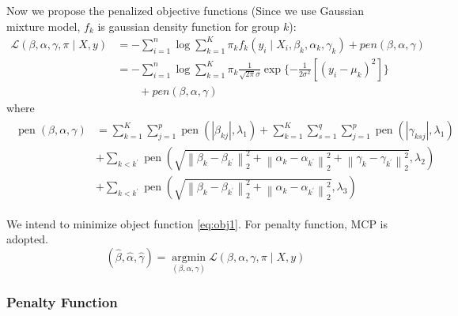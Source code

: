 \documentclass[12pt, a4paper, oneside]{article}
\numberwithin{equation}{section}
\begin{document}
Now we propose the penalized objective functions (Since we use Gaussian mixture model, $f_k$ is gaussian density function for group $k$):
\begin{equation}
	\label{eq:obj1}
	\begin{aligned}
		\mathcal{L}(\beta, \alpha, \gamma, \pi \mid X, y)
		&=-\sum_{i=1}^{n} \log \sum_{k=1}^{K} \pi_{k} f_{k}\left(y_{i} \mid X_{i}, \beta_k, \alpha_k, \gamma_k\right)+pen(\beta, \alpha, \gamma)\\
		&=-\sum_{i=1}^{n} \log \sum_{k=1}^{K} \pi_{k} 
		\frac{1}{\sqrt{2\pi} \sigma} \exp\{-\frac{1}{2\sigma^2}\left[(y_i - \mu_k)^2\right]\} \\
		&\qquad+pen(\beta, \alpha, \gamma)
	\end{aligned}
\end{equation}
where
\begin{equation}
	\begin{aligned}
		\begin{aligned}
			\operatorname{pen}(\beta, \alpha, \gamma)
			&=\sum_{k=1}^{K} \sum_{j=1}^{p} \operatorname{pen}\left(\left|\beta_{k j}\right|, \lambda_{1}\right)+\sum_{k=1}^{K} \sum_{s=1}^{q} \sum_{j=1}^{p} \operatorname{pen}\left(\left|\gamma_{k s j}\right|, \lambda_{1}\right) \\
			&+\sum_{k<k^{\prime}} \operatorname{pen}\left(\sqrt{\left\|\beta_{k}-\beta_{k^{\prime}}\right\|_{2}^{2}+\left\|\alpha_{k}-\alpha_{k^{\prime}}\right\|_{2}^{2}+\left\|\gamma_{k}-\gamma_{k^{\prime}}\right\|_{2}^{2}}, \lambda_{2}\right) \\
			&+\sum_{k<k^{\prime}} \operatorname{pen}\left(\sqrt{\left\|\beta_{k}-\beta_{k^{\prime}}\right\|_{2}^{2}+\left\|\alpha_{k}-\alpha_{k^{\prime}}\right\|_{2}^{2}}, \lambda_{3}\right)
		\end{aligned}
	\end{aligned}
\end{equation}

We intend to minimize object function \ref{eq:obj1}. For penalty function, MCP is adopted. 
\begin{equation}
	\label{eq:estimator1}
	(\hat\beta,\hat\alpha, \hat\gamma) = \mathop{\arg\min}\limits_{(\beta, \alpha, \gamma)} \mathcal{L}(\beta, \alpha, \gamma, \pi \mid X, y)
\end{equation}


\subsubsection{Penalty Function}
\label{subsubsec:penalty-function}
\end{document}
